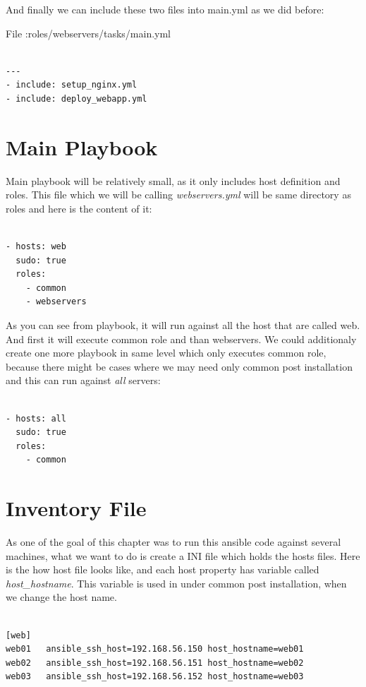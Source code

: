 \documentclass[10pt]{book}
\begin{document}
And finally we can include these two files into main.yml as we did before:

File :roles/webservers/tasks/main.yml
\begin{Verbatim} 
 
---
- include: setup_nginx.yml
- include: deploy_webapp.yml

\end{Verbatim}  


\section{Main Playbook}
Main playbook will be relatively small, as it only includes host definition and 
roles. This file which we will be calling \emph{webservers.yml} will be same 
directory as roles and here is the content of it:

\begin{Verbatim} 
 
- hosts: web
  sudo: true
  roles: 
    - common
    - webservers

\end{Verbatim}  

As you can see from playbook, it will run against all the host that are called 
web. And first it will execute common role and than webservers. We could 
additionaly create one more playbook in same level which only executes common 
role, because there might be cases where we may need only common post 
installation and this can run against \emph{all} servers:

\begin{Verbatim} 
 
- hosts: all
  sudo: true
  roles: 
    - common

\end{Verbatim}  

\section{Inventory File}
As one of the goal of this chapter was to run this ansible code against several 
machines, what we want to do is create a INI file which holds the hosts files. 
Here is the how host file looks like, and each host property has variable called 
\emph{host\_hostname}. This variable is used in under common post installation, 
when we change the host name. 

\begin{Verbatim} 
 
[web]
web01	ansible_ssh_host=192.168.56.150	host_hostname=web01
web02	ansible_ssh_host=192.168.56.151	host_hostname=web02
web03	ansible_ssh_host=192.168.56.152	host_hostname=web03

\end{Verbatim} 
\end{document}
